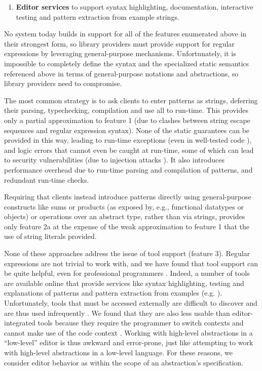 \begin{enumerate}
\item \textbf{Editor services} to support syntax highlighting, documentation, interactive testing and pattern extraction from example strings.
\end{enumerate}

No system today builds in support for all of the features enumerated above in their strongest form, so library providers must provide support for regular expressions by leveraging  general-purpose mechanisms. Unfortunately, it is impossible to completely define the syntax and the specialized static semantics referenced above in terms of general-purpose notations and abstractions, so library providers need to compromise. 

The most common strategy is to ask clients to enter patterns as strings, deferring their parsing, typechecking, compilation and use all to run-time. This provides only a partial approximation to feature 1 (due to clashes between string escape sequences and regular expression syntax). None of the static guarantees can be provided in this way, leading to run-time exceptions (even in well-tested code \cite{spishak2012type}), and logic errors that cannot even be caught at run-time, some of which can lead to security vulnerabilities (due to injection attacks \cite{owasp2013}). It also introduces performance overhead due to run-time parsing and compilation of patterns, and redundant run-time checks. 

Requiring that clients instead introduce patterns directly using general-purpose constructs like sums or products (as exposed by, e.g., functional datatypes or objects) or operations over an abstract type, rather than via strings, provides only feature 2a at the expense of the weak approximation to feature 1 that the use of string literals provided. 

None of these approaches address the issue of tool support (feature 3). Regular expressions are not trivial to work with, and we have found that tool support can be quite helpful, even for professional programmers \cite{Omar:2012:ACC:2337223.2337324}. Indeed, a number of tools are available online that provide services like syntax highlighting, testing and explanations of patterns \cite{regexr} and pattern extraction from examples (e.g. \cite{_txt2re:_????}). Unfortunately, tools that must be accessed externally are difficult to discover and are thus used infrequently \cite{Murphy-Hill:2011:PIE:1958824.1958888,Campbell:2008:DRT:1636642.1636651,Omar:2012:ACC:2337223.2337324}. We found that they are also less usable than editor-integrated tools %
because they require the programmer to switch contexts  and cannot make use of the code context \cite{Omar:2012:ACC:2337223.2337324}. Working with high-level abstractions in a ``low-level'' editor is thus awkward and error-prone, just like attempting to work with high-level abstractions in a low-level language. For these reasons,   we consider editor behavior as within the scope of an abstraction's specification.
